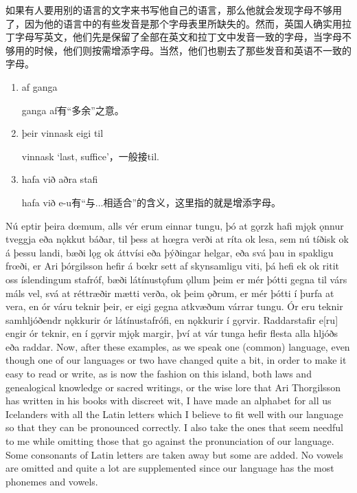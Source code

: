 \begin{translation*}{}
    如果有人要用别的语言的文字来书写他自己的语言，那么他就会发现字母不够用了，因为他的语言中的有些发音是那个字母表里所缺失的。然而，英国人确实用拉丁字母写英文，他们先是保留了全部在英文和拉丁文中发音一致的字母，当字母不够用的时候，他们则按需增添字母。当然，他们也剔去了那些发音和英语不一致的字母。
\end{translation*}
\begin{grammar*}{}
    \begin{enumerate}[leftmargin=*]
        \item af ganga

              ganga af有“多余”之意。

        \item þeir vinnask eigi til

              vinnask `last, suffice'，一般接til.

        \item hafa við aðra stafi

              hafa við e-u有“与...相适合”的含义，这里指的就是增添字母。
    \end{enumerate}
\end{grammar*}
\begin{paracol}{2}
    Nú eptir þeira dœmum, alls vér erum einnar tungu, þó at gǫrzk hafi mjǫk ǫnnur tveggja eða nǫkkut báðar, til þess at hœgra verði at ríta ok lesa, sem nú tíðisk ok á þessu landi, bæði lǫg ok áttvísi eða þýðingar helgar, eða svá þau in spakligu frœði, er Ari þórgilsson hefir á bœkr sett af skynsamligu viti, þá hefi ek ok ritit oss íslendingum stafróf, bæði látínustǫfum ǫllum þeim er mér þótti gegna til várs máls vel, svá at réttræðir mætti verða, ok þeim ǫðrum, er mér þótti í þurfa at vera, en ór váru teknir þeir, er eigi gegna atkvæðum várrar tungu. Ór eru teknir samhljóðendr nǫkkurir ór látínustafrófi, en nǫkkurir í gǫrvir. Raddarstafir e[ru] engir ór teknir, en í gǫrvir mjǫk margir, því at vár tunga hefir flesta alla hljóðs eða raddar.
    \switchcolumn
    Now, after these examples, as we speak one (common) language, even though one of our languages or two have changed quite a bit, in order to make it easy to read or write, as is now the fashion on this island, both laws and genealogical knowledge or sacred writings, or the wise lore that Ari Thorgilsson has written in his books with discreet wit, I have made an alphabet for all us Icelanders with all the Latin letters which I believe to fit well with our language so that they can be pronounced correctly. I also take the ones that seem needful to me while omitting those that go against the pronunciation of our language. Some consonants of Latin letters are taken away but some are added. No vowels are omitted and quite a lot are supplemented since our language has the most phonemes and vowels.
\end{paracol}
